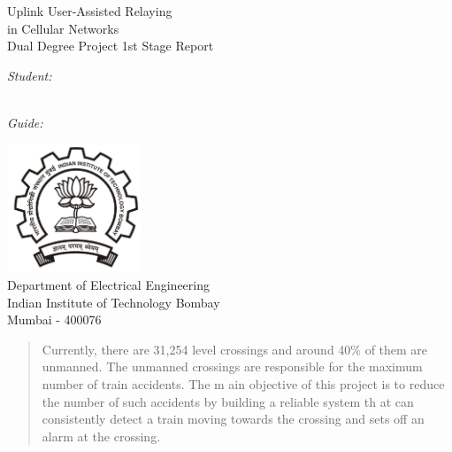 \documentclass[titlepage]{article}
\begin{document}
\begin{titlepage}
\begin{center}

{\Huge 
Uplink User-Assisted Relaying \\ in Cellular Networks 
}~\\[4cm]


{\large 
Dual Degree Project 1st Stage Report
}~\\[2cm]

\end{center}

\begin{multicols}{2}
\begin{flushleft}
{\large
\textit{Student:} \\
 \\
}
\end{flushleft}
\columnbreak
\begin{flushright}
{\large
\textit{Guide:} \\
}
\end{flushright}
\end{multicols}

\vfill

\begin{center}
\includegraphics[width=4cm]{figures/iitbblack.jpg}~\\[1cm]

{\large
Department of Electrical Engineering\\
Indian Institute of Technology Bombay\\
Mumbai - 400076\\
}

\end{center}
\end{titlepage}


\begin{abstract}
Currently, there are 31,254 level crossings and around 40\% of them are unmanned. The unmanned
crossings are responsible for the maximum number of train accidents. The m
ain objective of this project
is to reduce the number of such accidents by building a reliable system th
at can consistently detect a train
moving towards the crossing and sets off an alarm at the crossing.
\end{abstract}
\end{document}
